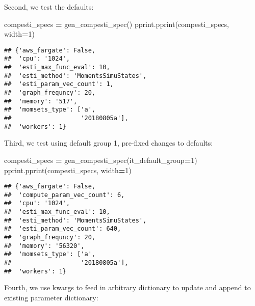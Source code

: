 \documentclass[
]{book}
\newenvironment{Shaded}{\begin{snugshade}}{\end{snugshade}}
\newcommand{\DecValTok}[1]{\textcolor[rgb]{0.00,0.00,0.81}{#1}}
\newcommand{\NormalTok}[1]{#1}
\newcommand{\OperatorTok}[1]{\textcolor[rgb]{0.81,0.36,0.00}{\textbf{#1}}}
\begin{document}
Second, we test the defaults:

\begin{Shaded}
\begin{Highlighting}[]
\NormalTok{compesti\_specs }\OperatorTok{=}\NormalTok{ gen\_compesti\_spec()}
\NormalTok{pprint.pprint(compesti\_specs, width}\OperatorTok{=}\DecValTok{1}\NormalTok{)}
\end{Highlighting}
\end{Shaded}

\begin{verbatim}
## {'aws_fargate': False,
##  'cpu': '1024',
##  'esti_max_func_eval': 10,
##  'esti_method': 'MomentsSimuStates',
##  'esti_param_vec_count': 1,
##  'graph_frequncy': 20,
##  'memory': '517',
##  'momsets_type': ['a',
##                   '20180805a'],
##  'workers': 1}
\end{verbatim}

Third, we test using default group 1, pre-fixed changes to defaults:

\begin{Shaded}
\begin{Highlighting}[]
\NormalTok{compesti\_specs }\OperatorTok{=}\NormalTok{ gen\_compesti\_spec(it\_default\_group}\OperatorTok{=}\DecValTok{1}\NormalTok{)}
\NormalTok{pprint.pprint(compesti\_specs, width}\OperatorTok{=}\DecValTok{1}\NormalTok{)}
\end{Highlighting}
\end{Shaded}

\begin{verbatim}
## {'aws_fargate': False,
##  'compute_param_vec_count': 6,
##  'cpu': '1024',
##  'esti_max_func_eval': 10,
##  'esti_method': 'MomentsSimuStates',
##  'esti_param_vec_count': 640,
##  'graph_frequncy': 20,
##  'memory': '56320',
##  'momsets_type': ['a',
##                   '20180805a'],
##  'workers': 1}
\end{verbatim}

Fourth, we use kwargs to feed in arbitrary dictionary to update and append to existing parameter dictionary:
\end{document}
